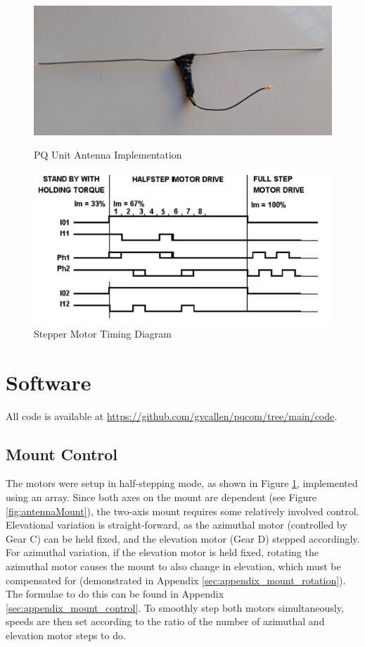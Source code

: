 \graphicspath{{./figures}}

\begin{figure}[!htb]
  \begin{minipage}{.45\textwidth}
    \centering
    \includegraphics[width=0.9\linewidth]{pqAntenna}
    \caption{PQ Unit Antenna Implementation}
    \label{fig:pqAntenna}
  \end{minipage}
  \begin{minipage}{.49\textwidth}
    \centering
    \includegraphics[width=0.98\linewidth]{stepperTiming}
    \caption{Stepper Motor Timing Diagram \cite{datasheet-L6219}}
    \label{fig:stepperTiming}
  \end{minipage}
\end{figure}

\section{Software}
All code is available at \url{https://github.com/gvcallen/pqcom/tree/main/code}.

\subsection{Mount Control}
The motors were setup in half-stepping mode, as shown in Figure \ref{fig:stepperTiming}, implemented using an array. Since both axes on the mount are dependent (see Figure \ref{fig:antennaMount}), the two-axis mount requires some relatively involved control. Elevational variation is straight-forward, as the azimuthal motor (controlled by Gear C) can be held fixed, and the elevation motor (Gear D) stepped accordingly. For azimuthal variation, if the elevation motor is held fixed, rotating the azimuthal motor causes the mount to also change in elevation, which must be compensated for (demonstrated in Appendix \ref{sec:appendix_mount_rotation}). The formulae to do this can be found in Appendix \ref{sec:appendix_mount_control}. To smoothly step both motors simultaneously, speeds are then set according to the ratio of the number of azimuthal and elevation motor steps to do.

